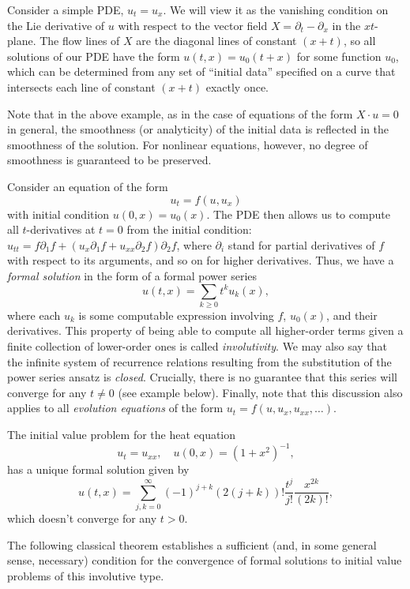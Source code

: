 Consider a simple PDE, $u_t=u_x$. We will view it as the vanishing condition on the Lie derivative of $u$ with respect to the vector field $X=\partial_t-\partial_x$ in the $xt$-plane. The flow lines of $X$ are the diagonal lines of constant $(x+t)$, so all solutions of our PDE have the form $u(t,x)=u_0(t+x)$ for some function $u_0$, which can be determined from any set of ``initial data'' specified on a curve that intersects each line of constant $(x+t)$ exactly once. 

Note that in the above example, as in the case of equations of the form $X\cdot u=0$ in general, the smoothness (or analyticity) of the initial data is reflected in the smoothness of the solution. For nonlinear equations, however, no degree of smoothness is guaranteed to be preserved. 

Consider an equation of the form 
\[u_t=f(u,u_x)\] 
with initial condition $u(0,x)=u_0(x)$. The PDE then allows us to compute all $t$-derivatives at $t=0$ from the initial condition: $u_{tt}=f\partial_1f+(u_x\partial_1 f+u_{xx}\partial_2f)\partial_2f$, where $\partial_i$ stand for partial derivatives of $f$ with respect to its arguments, and so on for higher derivatives. Thus, we have a \emph{formal solution} in the form of a formal power series 
\[u(t,x)=\sum_{k\geq 0}t^k u_k(x),\]
where each $u_k$ is some computable expression involving $f$, $u_0(x)$, and their derivatives. This property of being able to compute all higher-order terms given a finite collection of lower-order ones is called \emph{involutivity}. We may also say that the infinite system of recurrence relations resulting from the substitution of the power series ansatz is \emph{closed}.
Crucially, there is no guarantee that this series will converge for any $t\neq 0$ (see example below). Finally, note that this discussion also applies to all \emph{evolution equations} of the form $u_t=f(u,u_x,u_{xx},\ldots)$.

\begin{example}\label{example heat equation}
    The initial value problem for the heat equation 
    \[u_t=u_{xx},\quad u(0,x)=(1+x^2)^{-1},\] 
    has a unique formal solution given by 
    \[u(t,x)=\sum_{j,k=0}^\infty (-1)^{j+k}(2(j+k))!\frac{t^j}{j!}\frac{x^{2k}}{(2k)!},\]
    which doesn't converge for any $t>0$.
\end{example}

The following classical theorem establishes a sufficient (and, in some general sense, necessary) condition for the convergence of formal solutions to initial value problems of this involutive type.

